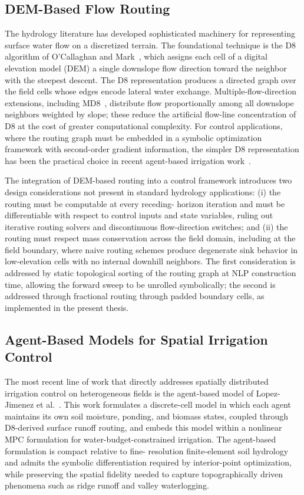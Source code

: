 \subsection{DEM-Based Flow Routing}

The hydrology literature has developed sophisticated machinery for
representing surface water flow on a discretized terrain. The
foundational technique is the D8 algorithm of O'Callaghan and
Mark~\cite{ocallaghan1984d8}, which assigns each cell of a digital
elevation model (DEM) a single downslope flow direction toward the
neighbor with the steepest descent. The D8 representation produces a
directed graph over the field cells whose edges encode lateral water
exchange. Multiple-flow-direction extensions, including
MD8~\cite{quinn1991mfd}, distribute flow proportionally among all
downslope neighbors weighted by slope; these reduce the artificial
flow-line concentration of D8 at the cost of greater computational
complexity. For control applications, where the routing graph must be
embedded in a symbolic optimization framework with second-order
gradient information, the simpler D8 representation has been the
practical choice in recent agent-based irrigation
work~\cite{Lopezjimenez2024,LopezJimenez2022}.

The integration of DEM-based routing into a control framework
introduces two design considerations not present in standard hydrology
applications: (i) the routing must be computable at every receding-
horizon iteration and must be differentiable with respect to control
inputs and state variables, ruling out iterative routing solvers and
discontinuous flow-direction switches; and (ii) the routing must
respect mass conservation across the field domain, including at the
field boundary, where naive routing schemes produce degenerate
sink behavior in low-elevation cells with no internal downhill
neighbors. The first consideration is addressed by static topological
sorting of the routing graph at NLP construction time, allowing the
forward sweep to be unrolled symbolically; the second is addressed
through fractional routing through padded boundary cells, as
implemented in the present thesis.

\subsection{Agent-Based Models for Spatial Irrigation Control}

The most recent line of work that directly addresses spatially
distributed irrigation control on heterogeneous fields is the
agent-based model of Lopez-Jimenez et al.~\cite{Lopezjimenez2024,LopezJimenez2022}.
This work formulates a discrete-cell model in which each agent
maintains its own soil moisture, ponding, and biomass states, coupled
through D8-derived surface runoff routing, and embeds this model
within a nonlinear MPC formulation for water-budget-constrained
irrigation. The agent-based formulation is compact relative to fine-
resolution finite-element soil hydrology and admits the symbolic
differentiation required by interior-point optimization, while
preserving the spatial fidelity needed to capture topographically
driven phenomena such as ridge runoff and valley waterlogging.

